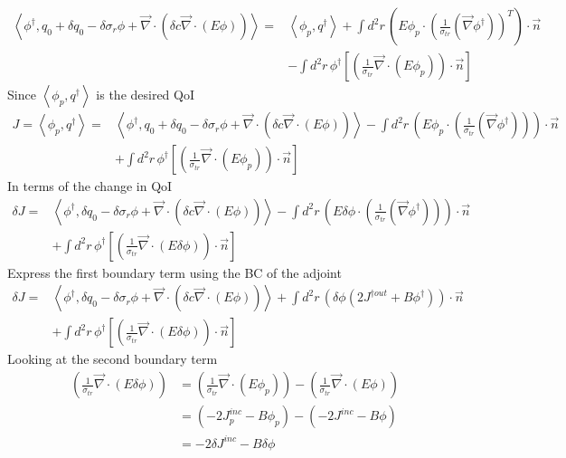 \documentclass{article}
\newcommand{\bra}{\left\langle}
\newcommand{\ket}{\right\rangle}
\newcommand{\vdiv}{\vec{\nabla} \cdot}
\newcommand{\vgrad}{\vec{\nabla}}
\begin{document}
\begin{align*}
\bra \phi^\dag , q_0 + \delta q_0 - \delta \sigma_r \phi + \vdiv \left( \delta c \vdiv \left( E \phi \right) \right) \ket =& \bra \phi_p, q^\dag \ket + \int d^2 r \, \left( E \phi_p \cdot \left( \frac{1}{ \sigma_{tr}} \left(  \vgrad \phi^\dag \right) \right)^T \right) \cdot \vec{n} \\
&- \int d^2 r \, \phi^\dag \left[ \left( \frac{1}{\sigma_{tr}} \vdiv \left( E \phi_p \right) \right) \cdot \vec{n} \right]
\end{align*}
Since $\bra \phi_p, q^\dag \ket $ is the desired QoI
\begin{align*}
J = \bra \phi_p, q^\dag \ket =& \bra \phi^\dag , q_0 + \delta q_0 - \delta \sigma_r \phi + \vdiv \left( \delta c \vdiv \left( E \phi \right) \right)  \ket - \int d^2 r \, \left( E \phi_p \cdot \left( \frac{1}{ \sigma_{tr}} \left(  \vgrad \phi^\dag \right) \right) \right) \cdot \vec{n} \\
&+ \int d^2 r \, \phi^\dag \left[ \left( \frac{1}{\sigma_{tr}} \vdiv \left( E \phi_p \right) \right) \cdot \vec{n} \right]
\end{align*}
In terms of the change in QoI
\begin{align*}
\delta J =& \bra \phi^\dag , \delta q_0 - \delta \sigma_r \phi + \vdiv \left( \delta c \vdiv \left( E \phi \right) \right)  \ket - \int d^2 r \, \left( E \delta \phi \cdot \left( \frac{1}{ \sigma_{tr}} \left(  \vgrad \phi^\dag \right) \right)\right) \cdot \vec{n} \\
&+ \int d^2 r \, \phi^\dag \left[ \left( \frac{1}{\sigma_{tr}} \vdiv \left( E \delta \phi \right) \right) \cdot \vec{n} \right]
\end{align*}
Express the first boundary term using the BC of the adjoint
\begin{align*}
\delta J =& \bra \phi^\dag , \delta q_0 - \delta \sigma_r \phi + \vdiv \left( \delta c \vdiv \left( E \phi \right) \right)  \ket + \int d^2 r \, \left(\delta \phi \left( 2J^{ \dag out } + B \phi^\dag \right) \right) \cdot \vec{n} \\
&+ \int d^2 r \, \phi^\dag \left[ \left( \frac{1}{\sigma_{tr}} \vdiv \left( E \delta \phi \right) \right) \cdot \vec{n} \right]
\end{align*}
Looking at the second boundary term
\begin{align*}
\left( \frac{1}{\sigma_{tr}} \vdiv \left( E \delta \phi \right) \right) 
& = \left( \frac{1}{\sigma_{tr}} \vdiv \left( E \phi_p \right) \right) - \left( \frac{1}{\sigma_{tr}} \vdiv \left( E \phi \right) \right) \\
&= (-2J_p^{inc} - B \phi_p) - (-2J^{inc} - B \phi) \\
&= -2\delta J^{inc} -B \delta \phi
\end{align*}
\end{document}
